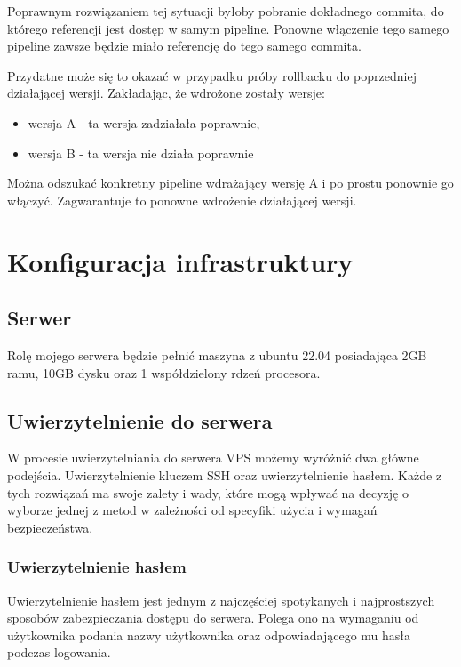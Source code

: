 \documentclass{article}
\begin{document}
Poprawnym rozwiązaniem tej sytuacji byłoby pobranie dokładnego commita, do którego referencji jest dostęp w samym pipeline. Ponowne włączenie tego samego pipeline zawsze będzie miało referencję do tego samego commita.

Przydatne może się to okazać w przypadku próby rollbacku do poprzedniej działającej wersji. Zakładając, że wdrożone zostały wersje:
\begin{itemize}
    \item wersja A - ta wersja zadziałała poprawnie,
    \item wersja B - ta wersja nie działa poprawnie
\end{itemize}

Można odszukać konkretny pipeline wdrażający wersję A i po prostu ponownie go włączyć. Zagwarantuje to ponowne wdrożenie działającej wersji.

\section{Konfiguracja infrastruktury}

\subsection{Serwer}

Rolę mojego serwera będzie pełnić maszyna z ubuntu 22.04 posiadająca 2GB ramu, 10GB dysku oraz 1 współdzielony rdzeń procesora.

\subsection{Uwierzytelnienie do serwera}

W procesie uwierzytelniania do serwera VPS możemy wyróżnić dwa główne podejścia. Uwierzytelnienie kluczem SSH oraz uwierzytelnienie hasłem. Każde z tych rozwiązań ma swoje zalety i wady, które mogą wpływać na decyzję o wyborze jednej z metod w zależności od specyfiki użycia i wymagań bezpieczeństwa.

\subsubsection{Uwierzytelnienie hasłem}

Uwierzytelnienie hasłem jest jednym z najczęściej spotykanych i najprostszych sposobów zabezpieczania dostępu do serwera. Polega ono na wymaganiu od użytkownika podania nazwy użytkownika oraz odpowiadającego mu hasła podczas logowania.
\end{document}

